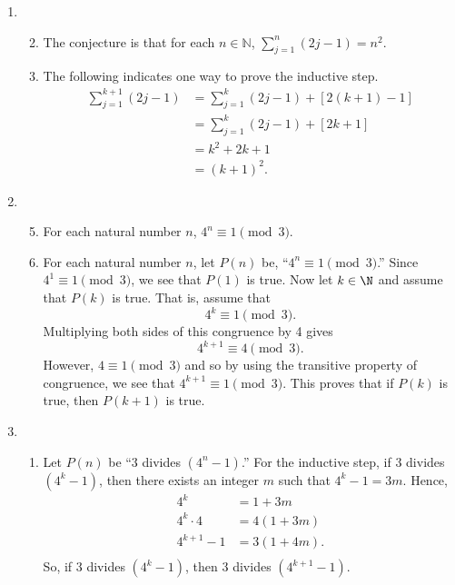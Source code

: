 \begin{enumerate}
\item \begin{enumerate} \setcounter{enumii}{1}
\item The conjecture is that  for each  $n \in \mathbb{N}$,  
$\sum\limits_{j = 1}^n {\left( {2j - 1} \right)}  = n^2 $.
\item The following indicates one way to prove the inductive step.
\begin{align*}
 \sum\limits_{j = 1}^{k + 1} {\left( {2j - 1} \right)}  &= \sum\limits_{j = 1}^k {\left( {2j - 1} \right)}  + \left[ {2\left( {k + 1} \right) - 1} \right] \\ 
   &= \sum\limits_{j = 1}^k {\left( {2j - 1} \right)}  + \left[ {2k + 1} \right] \\
   &= k^2 + 2k + 1 \\
   &= \left( k + 1 \right)^2.
\end{align*}
\end{enumerate}



\item \begin{enumerate} \setcounter{enumii}{4}
\item  For each natural number $n$, $4^n \equiv 1 \pmod 3$.

\item For each natural number $n$, let $P(n)$ be, ``$4^n \equiv 1 \pmod 3$.''  Since 
$4^1 \equiv 1 \pmod 3$, we see that $P(1)$ is true.  Now let $k \in \N$ and assume that 
$P(k)$ is true.  That is, assume that
\[
4^k \equiv 1 \pmod 3.
\]
Multiplying both sides of this congruence by 4 gives
\[
4^{k+1} \equiv 4 \pmod 3.
\]
However, $4 \equiv 1 \pmod 3$ and so by using the transitive property of congruence, we see that 
$4^{k+1} \equiv 1 \pmod 3$.  This proves that if $P(k)$ is true, then $P(k+1)$ is true.
\end{enumerate}



\item \begin{enumerate}
\item Let $P \left( n \right)$ be ``3 divides $\left( 4^n - 1 \right)$.''  For the inductive step, if 3 divides $ \left( 4^k -1 \right)$, then there exists an integer $m$ such that $4^k -1 = 3m$.  Hence,
\[
\begin{aligned}
4^k &= 1 + 3m \\
4^k \cdot 4 &= 4 \left( 1 + 3m \right) \\
4^{k+1} - 1 &= 3 \left(1 + 4m \right). \\
\end{aligned}
\]
So, if 3 divides $ \left( 4^k -1 \right)$, then 3 divides $ \left( 4^{k+1} -1 \right)$.


\end{enumerate}
\end{enumerate}
